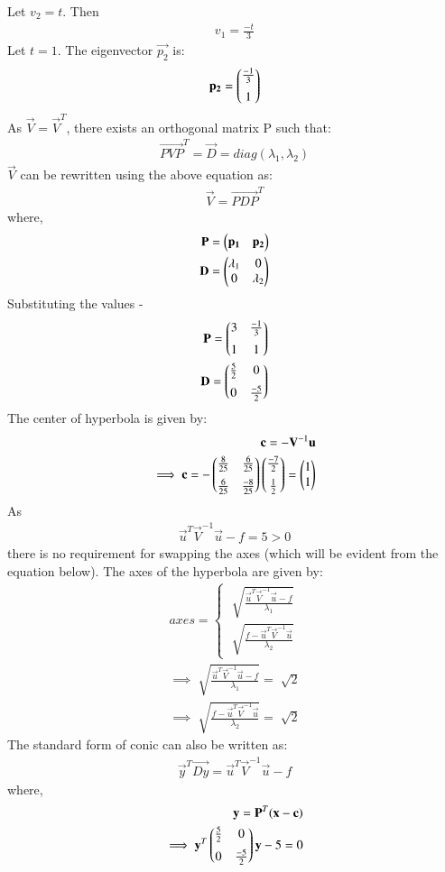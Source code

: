 \documentclass[journal,12pt,twocolumn]{IEEEtran}
\begin{document}
Let $v_2 = t$. Then
\begin{align}
  v_1 = \frac{-t}{3}
\end{align}
Let $t = 1$. The eigenvector $\vec{p_2}$ is:
\begin{align}
  \mathbf{p_2} = \begin{pmatrix}\frac{-1}{3} \\[0.2cm] 1\end{pmatrix}
\end{align}
As $\vec{V} = \vec{V}^T$, there exists an orthogonal matrix P such that:
\begin{align}
  \vec{PVP}^T = \vec{D} = diag(\lambda_1, \lambda_2)
\end{align}
$\vec{V}$ can be rewritten using the above equation as:
\begin{align}
  \vec{V} = \vec{PDP}^T
\end{align}
where,
\begin{align}
  \mathbf{P} = \begin{pmatrix}\mathbf{p_1} & \mathbf{p_2}\end{pmatrix} \\
  \mathbf{D} = \begin{pmatrix}\lambda_1 & 0 \\ 0 & \lambda_2\end{pmatrix}
\end{align}
Substituting the values -
\begin{align}
  \mathbf{P} = \begin{pmatrix}3 & \frac{-1}{3}\\[0.2cm] 1 & 1\end{pmatrix} \\
  \mathbf{D} = \begin{pmatrix}\frac{5}{2} & 0 \\[0.2cm] 0 & \frac{-5}{2}\end{pmatrix}
\end{align}
The center of hyperbola is given by:
\begin{align}
  \mathbf{c} = -\mathbf{V}^{-1}\mathbf{u} \\
  \implies \mathbf{c} = -\begin{pmatrix}\frac{8}{25} & \frac{6}{25} \\[0.2cm] \frac{6}{25} & \frac{-8}{25}\end{pmatrix} \begin{pmatrix}\frac{-7}{2} \\[0.2cm]\frac{1}{2}\end{pmatrix} = \begin{pmatrix}1 \\ 1\end{pmatrix}
\end{align}
As
\begin{align}
  \vec{u}^T\vec{V}^{-1}\vec{u} - f = 5 > 0
\end{align}
there is no requirement for swapping the axes (which will be evident from the equation below). The axes of the hyperbola are given by:
\begin{align}
  axes = \begin{cases}
    \sqrt[]{\frac{\vec{u}^T\vec{V}^{-1}\vec{u} - f}{\lambda_1}} \\
    \sqrt[]{\frac{f - \vec{u}^T\vec{V}^{-1}\vec{u}}{\lambda_2}}
  \end{cases} \\
  \implies \sqrt[]{\frac{\vec{u}^T\vec{V}^{-1}\vec{u} - f}{\lambda_1}} = \sqrt[]{2} \\
  \implies \sqrt[]{\frac{f - \vec{u}^T\vec{V}^{-1}\vec{u}}{\lambda_2}} = \sqrt[]{2}
\end{align}
The standard form of conic can also be written as:
\begin{align}
  \vec{y}^T\vec{Dy} = \vec{u}^T\vec{V}^{-1}\vec{u} - f
\end{align}
where,
\begin{align}
  \mathbf{y} = \mathbf{P}^T(\mathbf{x-c}) \\
  \implies \mathbf{y}^T \begin{pmatrix}\frac{5}{2} & 0 \\[0.2cm] 0 & \frac{-5}{2}\end{pmatrix} \mathbf{y} -5 = 0
\end{align}
\end{document}
